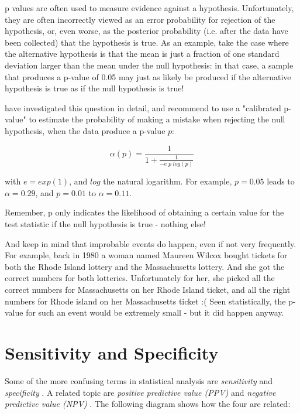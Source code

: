 p values are often used to measure evidence against a hypothesis. Unfortunately, they are often incorrectly viewed as an error probability for rejection of the hypothesis, or, even worse, as the posterior probability (i.e. after the data have been collected) that the hypothesis is true. As an example, take the case where the alternative hypothesis is that the mean is just a fraction of one standard deviation larger than the mean under the null hypothesis: in that case, a sample that produces a p-value of 0.05 may just as likely be produced if the alternative hypothesis is true as if the null hypothesis is true!

\cite{sellke2001} have investigated this question in detail, and recommend to use a "calibrated p-value" to estimate the probability of making a mistake when rejecting the null hypothesis, when the data produce a p-value $p$:

\begin{equation}\label{eq:pFallacy}
    \alpha(p)= \frac{1}{1 + \frac{1}{-e \; p \; log(p)}}
\end{equation}

with $e=exp(1)$, and $log$ the natural logarithm. For example, $p=0.05$ leads to $\alpha=0.29$, and $p=0.01$ to $\alpha=0.11$.

Remember, p only indicates the likelihood of obtaining a certain value for the test statistic if the null hypothesis is true - nothing else!

And keep in mind that improbable events do happen, even if not very frequently. For example, back in 1980 a woman named Maureen Wilcox bought tickets for both the Rhode Island lottery and the Massachusetts lottery. And she got the correct numbers for both lotteries. Unfortunately for her, she picked all the correct numbers for Massachusetts on her Rhode Island ticket, and all the  right numbers for Rhode island on her Massachusetts ticket :(  Seen statistically, the p-value for such an event would be extremely small - but it did happen anyway.

\section{Sensitivity and Specificity}

Some of the more confusing terms in statistical analysis are \emph{sensitivity}  and \emph{specificity} . A related topic are \emph{positive predictive value (PPV)}  and \emph{negative predictive value (NPV)} . The following diagram shows how the four are related:

